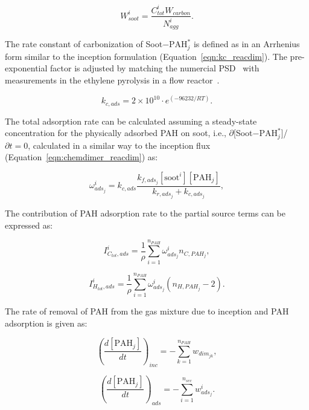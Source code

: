 \begin{equation}
	W^i_{soot}=\frac{C^i_{tot}W_{carbon}}{N^i_{agg}}.
\end{equation}

The rate constant of carbonization of Soot$-$$\mathrm{PAH}^*_j$ is defined as in an Arrhenius form similar to the inception formulation (Equation~\eqref{eqn:kc_reacdim}). The pre-exponential factor is adjusted by matching the numercial PSD~\citep{naseri2022simulating} with measurements in the ethylene pyrolysis in a flow reactor~\cite{araki2021effects}. 

\begin{equation}
	k_{c,ads} = 2\times10^{10}\cdot e^{(-96232/RT)}
	\label{eqn:kcads_reacdim}.
\end{equation}


The total adsorption rate can be calculated assuming a steady-state concentration for the physically adsorbed PAH on soot, i.e., $\partial$[Soot$-\mathrm{PAH}^*_j$]/$\partial t=0$, calculated in a similar way to the inception flux (Equation~\eqref{eqn:chemdimer_reacdim}) as:

\begin{equation}
	\omega^i_{ads_j} = k_{c,ads}\frac{k_{f,ads_j}[\mathrm{soot}^i][\mathrm{PAH}_j]}{k_{r,ads_j}+k_{c,ads_j}}
	\label{eqn:wads_reacdim},
\end{equation}

The contribution of PAH adsorption rate to the partial source terms can be expressed as:

\begin{equation}
	I^i_{C_{tot},ads} =
	\frac{1}{\rho}
	\sum_{i=1}^{n_{PAH}}
	\omega^i_{ads_j}
	n_{C,PAH_j}
	\label{eqn:ICtotads_reacdim},
\end{equation}

\begin{equation}
	I^i_{H_{tot},ads} =
	\frac{1}{\rho}
	\sum_{i=1}^{n_{PAH}}
	\omega^i_{ads_j}
	\left(n_{H,PAH_j}-2\right)
	\label{eqn:IHtotads_reacdim}.
\end{equation}

The rate of removal of PAH from the gas mixture due to inception and PAH adsorption is given as:

\begin{equation}
	\left(
	\frac{d\left[{\mathrm{PAH}_j}\right]}{dt}
	\right)_{inc}
	= 
	-\sum_{k=1}^{n_{PAH}}w_{dim_{jk}},
	\label{eqn:PAHscrub_inc_reacdim}
\end{equation}

\begin{equation}
	\left(
	\frac{d\left[{\mathrm{PAH}_j}\right]}{dt}
	\right)_{ads}
	= -\sum_{i=1}^{n_{sec}}w^i_{ads_j}.
	\label{eqn:PAHscrub_ads_reacdim}
\end{equation}

